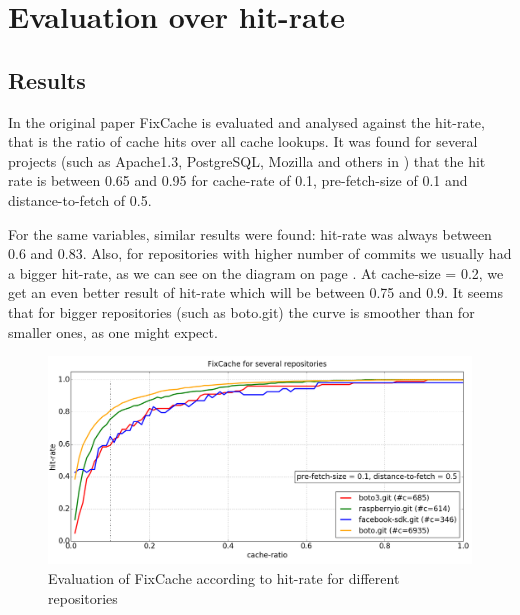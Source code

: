\documentclass[12pt,twoside,notitlepage]{report}
\newcommand{\fxch}{FixCache}
\begin{document}
\section{Evaluation over hit-rate}
\subsection{Results}
In the original paper \fxch{} is evaluated and analysed against the hit-rate, that is the ratio of cache hits over all cache lookups. It was found for several projects (such as Apache1.3, PostgreSQL, Mozilla and others in \cite{FixCache}) that the hit rate is between 0.65 and 0.95 for cache-rate of 0.1, pre-fetch-size of 0.1 and distance-to-fetch of 0.5.

For the same variables, similar results were found: hit-rate was always between 0.6 and 0.83. Also, for repositories with higher number of commits we usually had a bigger hit-rate, as we can see on the diagram on page \pageref{fig:v5_repos}. At cache-size = 0.2, we get an even better result of hit-rate which will be between 0.75 and 0.9. It seems that for bigger repositories (such as boto.git) the curve is smoother than for smaller ones, as one might expect.
\begin{figure}[th!]
\includegraphics[width=1.0\textwidth]{plot_several.png}
\caption{Evaluation of \fxch{} according to hit-rate for different repositories}
\label{fig:v5_repos}
\end{figure}
\end{document}
